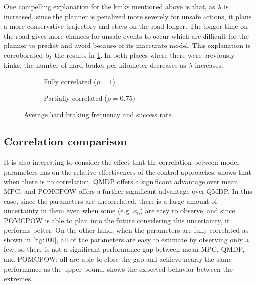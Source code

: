 One compelling explanation for the kinks mentioned above is that, as $\lambda$ is increased, since the planner is penalized more severely for unsafe actions, it plans a more conservative trajectory and stays on the road longer.
The longer time on the road gives more chances for unsafe events to occur which are difficult for the planner to predict and avoid because of its inaccurate model.
This explanation is corroborated by the results in \cref{fig:bpkm}.
In both places where there were previously kinks, the number of hard brakes per kilometer decreases as $\lambda$ increases.

\begin{figure}[htpb]
    \centering
    \begin{subfigure}[b]{0.48\textwidth}
        \begin{center}
            
        \end{center}
        \caption{Fully correlated ($\rho=1$)}
    \end{subfigure}
    \hfill
    \begin{subfigure}[b]{0.48\textwidth}
        \begin{center}
            
        \end{center}
        \caption{Partially correlated ($\rho=0.75$)}
    \end{subfigure}
    
    \centering
    \caption{Average hard braking frequency and success rate}
    \label{fig:bpkm}
\end{figure}


\subsection{Correlation comparison}

It is also interesting to consider the effect that the correlation between model parameters has on the relative effectiveness of the control approaches.
 shows that when there is no correlation, QMDP offers a significant advantage over mean MPC, and POMCPOW offers a further significant advantage over QMDP.
In this case, since the parameters are uncorrelated, there is a large amount of uncertainty in them even when some (e.g. $\dot{x}_0$) are easy to observe, and since POMCPOW is able to plan into the future considering this uncertainty, it performs better.
On the other hand, when the parameters are fully correlated as shown in \cref{fig:100}, all of the parameters are easy to estimate by observing only a few, so there is not a significant performance gap between mean MPC, QMDP, and POMCPOW; all are able to close the gap and achieve nearly the same performance as the upper bound.
 shows the expected behavior between the extremes.

